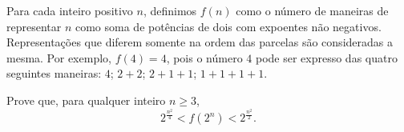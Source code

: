 Para cada inteiro positivo $n$, definimos $f(n)$ como o número de maneiras de representar $n$ como soma de potências de dois com expoentes não negativos. Representações que diferem somente na ordem das parcelas são consideradas a mesma. Por exemplo, $f(4) = 4$, pois o número $4$ pode ser expresso das quatro seguintes maneiras: $4$; $2+2$; $2+1+1$; $1+1+1+1$.

Prove que, para qualquer inteiro $ n \geq 3$, \[2^{\frac {n^2}{4}} < f(2^n) < 2^{\frac {n^2}2}.\]
